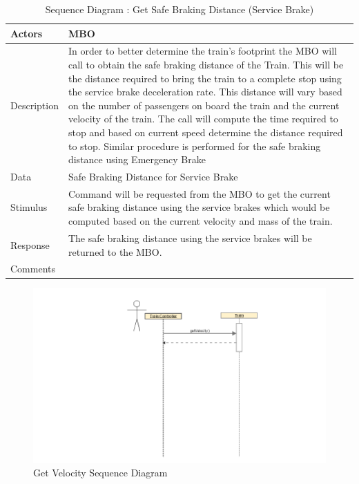 \documentclass[]{article}
\begin{document}
\begin{table}[H]
	\centering
	\caption{Sequence Diagram : Get Safe Braking Distance (Service Brake)}
	\begin{tabular}{|l|l|}
		\hline
		Actors & \parbox[t]{10cm}{MBO} \\ \hline
		Description & \parbox[t]{10cm}{In order to better determine the train's footprint the MBO will call to obtain the safe braking distance of the Train. This will be the distance required to bring the train to a complete stop using the service brake deceleration rate. This distance will vary based on the number of passengers on board the train and the current velocity of the train. The call will compute the time required to stop and based on current speed determine the distance required to stop. Similar procedure is performed for the safe braking distance using Emergency Brake} \\ \hline
		Data &  \parbox[t]{10cm}{Safe Braking Distance for Service Brake} \\ \hline
		Stimulus &  \parbox[t]{10cm}{Command will be requested from the MBO to get the current safe braking distance using the service brakes which would be computed based on the current velocity and mass of the train.} \\ \hline
		Response & \parbox[t]{10cm}{The safe braking distance using the service brakes will be returned to the MBO.}\\ \hline
		Comments & \parbox[t]{10cm}{ }  \\ \hline
	\end{tabular}
\end{table}

\begin{figure}[H]
	\centering
	\includegraphics[scale=.5]{train_model_sqd_get_velocity.png}
	\caption{Get Velocity Sequence Diagram}
\end{figure}
\end{document}
